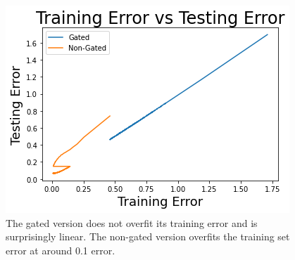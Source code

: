 \documentclass[prl,superscriptaddress,showpacs,twocolumn]{revtex4-1}
\begin{document}
\begin{figure}[H]
    \centering
    \includegraphics[width=\linewidth]{figures/training_error_vs_testing_error.png}
    \caption{The gated version does not overfit its training error and is surprisingly linear. The non-gated version overfits the training set error at around 0.1 error. }
    \label{fig:train_test_err}
\end{figure}
\end{document}
